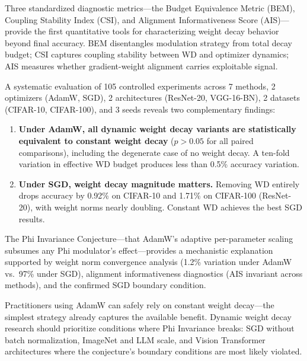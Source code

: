 \documentclass[
]{article}
\begin{document}
Three standardized diagnostic metrics---the Budget Equivalence Metric
(BEM), Coupling Stability Index (CSI), and Alignment Informativeness
Score (AIS)---provide the first quantitative tools for characterizing
weight decay behavior beyond final accuracy. BEM disentangles modulation
strategy from total decay budget; CSI captures coupling stability
between WD and optimizer dynamics; AIS measures whether gradient-weight
alignment carries exploitable signal.

A systematic evaluation of 105 controlled experiments across 7 methods,
2 optimizers (AdamW, SGD), 2 architectures (ResNet-20, VGG-16-BN), 2
datasets (CIFAR-10, CIFAR-100), and 3 seeds reveals two complementary
findings:

\begin{enumerate}
\def\labelenumi{\arabic{enumi}.}
\item
  \textbf{Under AdamW, all dynamic weight decay variants are
  statistically equivalent to constant weight decay} (\(p > 0.05\) for
  all paired comparisons), including the degenerate case of no weight
  decay. A ten-fold variation in effective WD budget produces less than
  0.5\% accuracy variation.
\item
  \textbf{Under SGD, weight decay magnitude matters.} Removing WD
  entirely drops accuracy by 0.92\% on CIFAR-10 and 1.71\% on CIFAR-100
  (ResNet-20), with weight norms nearly doubling. Constant WD achieves
  the best SGD results.
\end{enumerate}

The Phi Invariance Conjecture---that AdamW's adaptive per-parameter
scaling subsumes any Phi modulator's effect---provides a mechanistic
explanation supported by weight norm convergence analysis (1.2\%
variation under AdamW vs.~97\% under SGD), alignment informativeness
diagnostics (AIS invariant across methods), and the confirmed SGD
boundary condition.

Practitioners using AdamW can safely rely on constant weight decay---the
simplest strategy already captures the available benefit. Dynamic weight
decay research should prioritize conditions where Phi Invariance breaks:
SGD without batch normalization, ImageNet and LLM scale, and Vision
Transformer architectures where the conjecture's boundary conditions are
most likely violated.
\end{document}
